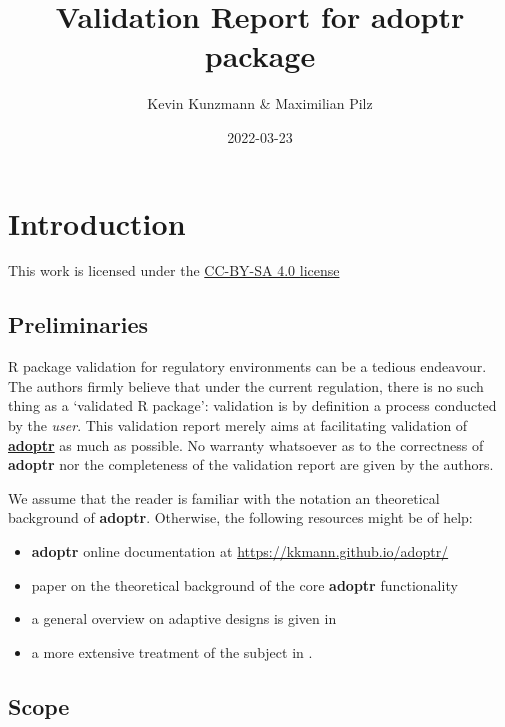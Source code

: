 \documentclass[
]{book}
\title{Validation Report for \textbf{adoptr} package}
\author{Kevin Kunzmann \& Maximilian Pilz}
\date{2022-03-23}
\providecommand{\tightlist}{%
  \setlength{\itemsep}{0pt}\setlength{\parskip}{0pt}}
\begin{document}
\maketitle

{
\setcounter{tocdepth}{1}
\tableofcontents
}
\hypertarget{introduction}{%
\chapter{Introduction}\label{introduction}}

This work is licensed under the \href{https://creativecommons.org/licenses/by-sa/4.0/deed.en}{CC-BY-SA 4.0 license}

\hypertarget{preliminaries}{%
\section{Preliminaries}\label{preliminaries}}

R package validation for regulatory environments can be a
tedious endeavour.
The authors firmly believe that under the current regulation,
there is no such thing as a `validated R package':
validation is by definition a process conducted by the \emph{user}.
This validation report merely aims at facilitating
validation of \textbf{\href{https://github.com/kkmann/adoptr}{adoptr}} as
much as possible.
No warranty whatsoever as to the correctness of \textbf{adoptr} nor the
completeness of the validation report are given by the authors.

We assume that the reader is familiar with the notation an theoretical
background of \textbf{adoptr}.
Otherwise, the following resources might be of help:

\begin{itemize}
\tightlist
\item
  \textbf{adoptr} online documentation at \url{https://kkmann.github.io/adoptr/}
\item
  paper on the theoretical background of the core \textbf{adoptr} functionality \citep{variational}
\item
  a general overview on adaptive designs is given in \citep{Bauer2015}
\item
  a more extensive treatment of the subject in \citep{Wassmer2016}.
\end{itemize}

\hypertarget{scope}{%
\section{Scope}\label{scope}}
\end{document}
